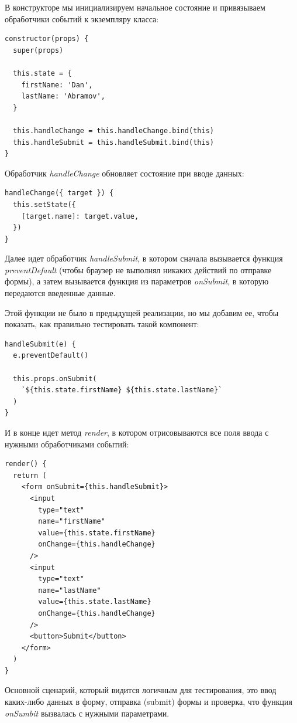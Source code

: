 В конструкторе мы инициализируем начальное состояние и привязываем обработчики событий к экземпляру класса:

\begin{lstlisting}
constructor(props) {
  super(props)
  
  this.state = {
    firstName: 'Dan',
    lastName: 'Abramov',
  }
  
  this.handleChange = this.handleChange.bind(this)
  this.handleSubmit = this.handleSubmit.bind(this)
}
\end{lstlisting}

Обработчик \textit{handleChange} обновляет состояние при вводе данных:

\begin{lstlisting}
handleChange({ target }) {
  this.setState({
    [target.name]: target.value,
  })
}
\end{lstlisting}

Далее идет обработчик \textit{handleSubmit}, в котором сначала вызывается функция \textit{preventDefault} (чтобы браузер не выполнял никаких действий по отправке формы), а затем вызывается функция из параметров \textit{onSubmit}, в которую передаются введенные данные.

Этой функции не было в предыдущей реализации, но мы добавим ее, чтобы показать, как правильно тестировать такой компонент:

\begin{lstlisting}
handleSubmit(e) {
  e.preventDefault()
  
  this.props.onSubmit(
    `${this.state.firstName} ${this.state.lastName}`
  )
}
\end{lstlisting}

И в конце идет метод \textit{render}, в котором отрисовываются все поля ввода с нужными обработчиками событий:

\begin{lstlisting}
render() {
  return (
    <form onSubmit={this.handleSubmit}>
      <input
        type="text"
        name="firstName"
        value={this.state.firstName}
        onChange={this.handleChange}
      />
      <input
        type="text"
        name="lastName"
        value={this.state.lastName}
        onChange={this.handleChange}
      />
      <button>Submit</button>
    </form>
  )
}
\end{lstlisting}

Основной сценарий, который видится логичным для тестирования, это ввод каких-либо данных в форму, отправка (submit) формы и проверка, что функция \textit{onSumbit} вызвалась с нужными параметрами.

